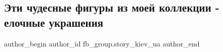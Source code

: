  
 
 
 
 
 
\subsection{Эти чудесные фигуры из моей коллекции - елочные украшения}
\label{sec:31_12_2021.fb.fb_group.story_kiev_ua.1.jolka_ukrashenia}
 
\ifcmt
 author_begin
   author_id fb_group.story_kiev_ua
 author_end
\fi
